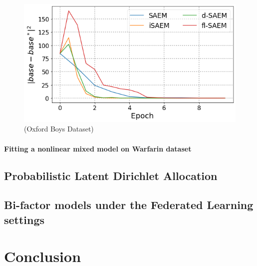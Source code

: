 \documentclass[11pt]{article}
\theoremstyle{t}
\begin{document}
\begin{figure}[H]
\hspace{-0.15in}
\includegraphics[width=\linewidth]{fig/flsaem_oxboys_mc.png}
   \caption{(Oxford Boys Dataset)}
\label{fig:resultstoy}
\end{figure}

\paragraph{Fitting a nonlinear mixed model on Warfarin dataset \citep{international2009estimation}}


\subsection{Probabilistic Latent Dirichlet Allocation}



\subsection{Bi-factor models under the Federated Learning settings}

\clearpage

\section{Conclusion}


\newpage






\end{document}
